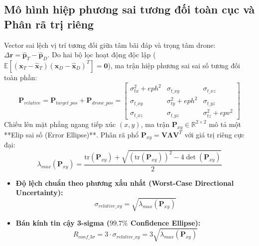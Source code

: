 \documentclass[12pt,a4paper]{article}
\begin{document}
\subsection{Mô hình hiệp phương sai tương đối toàn cục và Phân rã trị riêng}
Vector sai lệch vị trí tương đối giữa tâm bãi đáp và trọng tâm drone: $\Delta \mathbf{r} = \hat{\mathbf{p}}_T - \hat{\mathbf{p}}_D$. Do hai bộ lọc hoạt động độc lập ($\mathbb{E}[(\mathbf{x}_T - \hat{\mathbf{x}}_T)(\mathbf{x}_D - \hat{\mathbf{x}}_D)^T] = \mathbf{0}$), ma trận hiệp phương sai sai số tương đối toàn phần:
\begin{equation}
    \mathbf{P}_{relative} = \mathbf{P}_{target\_pos} + \mathbf{P}_{drone\_pos} = \begin{bmatrix}
        \sigma_{tx}^2 + eph^2 & \sigma_{t\_xy} & \sigma_{t\_xz} \\
        \sigma_{t\_xy} & \sigma_{ty}^2 + eph^2 & \sigma_{t\_yz} \\
        \sigma_{t\_xz} & \sigma_{t\_yz} & \sigma_{tz}^2 + epv^2
    \end{bmatrix}
\end{equation}
Chiếu lên mặt phẳng ngang tiếp xúc $(x, y)$, ma trận $\mathbf{P}_{xy} \in \mathbb{R}^{2 \times 2}$ mô tả một **Elip sai số (Error Ellipse)**. Phân rã phổ $\mathbf{P}_{xy} = \mathbf{V} \mathbf{\Lambda} \mathbf{V}^T$ với giá trị riêng cực đại:
\begin{equation}
    \lambda_{max}(\mathbf{P}_{xy}) = \frac{\text{tr}(\mathbf{P}_{xy}) + \sqrt{(\text{tr}(\mathbf{P}_{xy}))^2 - 4\det(\mathbf{P}_{xy})}}{2}
\end{equation}
\begin{itemize}[noitemsep,topsep=2pt]
    \item \textbf{Độ lệch chuẩn theo phương xấu nhất (Worst-Case Directional Uncertainty):}
    \begin{equation}
        \sigma_{relative\_xy} = \sqrt{\lambda_{max}(\mathbf{P}_{xy})}
    \end{equation}
    \item \textbf{Bán kính tin cậy 3-sigma ($99.7\%$ Confidence Ellipse):}
    \begin{equation}
        R_{conf\_3\sigma} = 3 \cdot \sigma_{relative\_xy} = 3 \sqrt{\lambda_{max}(\mathbf{P}_{xy})}
    \end{equation}
\end{itemize}
\end{document}
